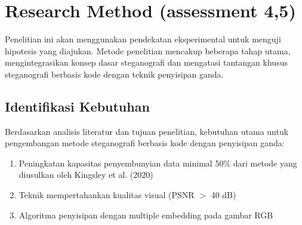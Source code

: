 \documentclass{ittelkom}
\begin{document}


\section{Research Method \color{red}(assessment 4,5)}

Penelitian ini akan menggunakan pendekatan eksperimental untuk menguji
hipotesis yang diajukan. Metode penelitian mencakup beberapa tahap utama,
mengintegrasikan konsep dasar steganografi dan mengatasi tantangan khusus
steganografi berbasis kode dengan teknik penyisipan ganda.

\subsection{Identifikasi Kebutuhan}

Berdasarkan analisis literatur dan tujuan penelitian, kebutuhan utama untuk
pengembangan metode steganografi berbasis kode dengan penyisipan ganda:

\begin{enumerate}
    \item Peningkatan kapasitas penyembunyian data minimal 50\% dari metode yang
          diusulkan oleh Kingsley et al. (2020)
    \item Teknik mempertahankan kualitas visual (PSNR $>$ 40 dB)
    \item Algoritma penyisipan dengan multiple embedding pada gambar RGB
\end{enumerate}
\end{document}
